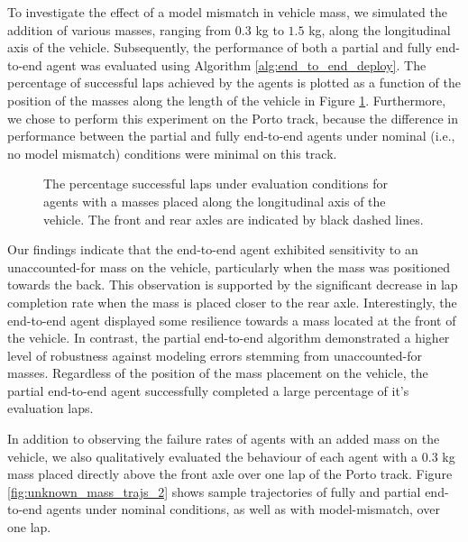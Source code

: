 To investigate the effect of a model mismatch in vehicle mass, we simulated the addition of various masses, ranging from $0.3$ kg to $1.5$ kg, along the longitudinal axis of the vehicle.
Subsequently, the performance of both a partial and fully end-to-end agent was evaluated using Algorithm \ref{alg:end_to_end_deploy}. 
The percentage of successful laps achieved by the agents is plotted as a function of the position of the masses along the length of the vehicle in Figure \ref{fig:unknown_mass}.
Furthermore, we chose to perform this experiment on the Porto track, because the difference in performance between the partial and fully end-to-end agents under nominal 
(i.e., no model mismatch) conditions were minimal on this track.

\begin{figure}[htb!]
    \centering
    
    \caption[Percentage successful laps under evaluation conditions for agents with masses placed along the longitudinal axis of the vehicle]{The percentage successful laps under evaluation conditions for agents with a masses placed along the longitudinal axis of the vehicle. The front and rear axles are indicated by black dashed lines.}
    \label{fig:unknown_mass}
\end{figure}

Our findings indicate that the end-to-end agent exhibited sensitivity to an unaccounted-for mass on the vehicle, particularly when the mass was positioned towards the back. 
This observation is supported by the significant decrease in lap completion rate when the mass is placed closer to the rear axle. 
Interestingly, the end-to-end agent displayed some resilience towards a mass located at the front of the vehicle. 
In contrast, the partial end-to-end algorithm demonstrated a higher level of robustness against modeling errors stemming from unaccounted-for masses. 
Regardless of the position of the mass placement on the vehicle, the partial end-to-end agent successfully completed a large percentage of it's evaluation laps.

In addition to observing the failure rates of agents with an added mass on the vehicle, we also qualitatively evaluated the behaviour of each agent with a $0.3$ kg mass placed directly above the front axle over one lap of the Porto track.
Figure \ref{fig:unknown_mass_trajs_2} shows sample trajectories of fully and partial end-to-end agents under nominal conditions, as well as with model-mismatch, over one lap.

